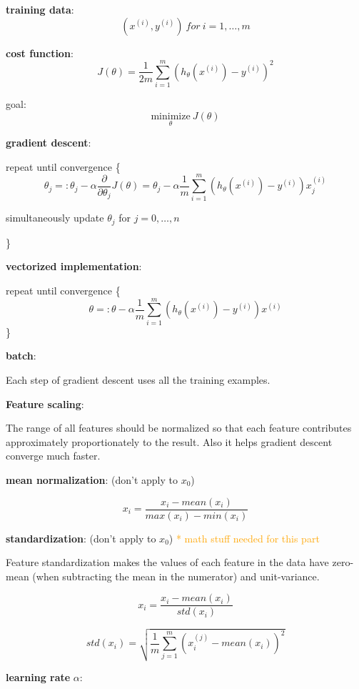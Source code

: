 \documentclass{article}
\begin{document}
\noindent \textbf{training data}:
\[(x^{(i)}, y^{(i)})\:for\:i = 1, \dots, m\]

\noindent \textbf{cost function}:
\[J(\theta) = \frac{1}{2m} \sum_{i = 1}^m (h_{\theta}(x^{(i)}) - y^{(i)})^2\]

\noindent goal:
\[\underset{\theta}{\text{minimize}} \: J(\theta)\]

\noindent \textbf{gradient descent}:

\noindent repeat until convergence \{
\[\theta_j =: \theta_j - \alpha \frac{\partial}{\partial \theta_j} J(\theta) = \theta_j - \alpha \frac{1}{m} \sum_{i = 1}^m (h_{\theta}(x^{(i)}) - y^{(i)}) x^{(i)}_j\]
\centerline{simultaneously update \(\theta_j\) for \(j = 0, \dots, n\)}
\}

\bigskip

\noindent \textbf{vectorized implementation}:

\noindent repeat until convergence \{
\[\theta =: \theta - \alpha \frac{1}{m} \sum_{i = 1}^m (h_{\theta}(x^{(i)}) - y^{(i)}) x^{(i)}\]
\}

\bigskip

\noindent \textbf{batch}:

\noindent Each step of gradient descent uses all the training examples.

\bigskip

\noindent \textbf{Feature scaling}:

\noindent The range of all features should be normalized so that each feature contributes approximately proportionately to the result. Also it helps gradient descent converge much faster.

\bigskip

\noindent \textbf{mean normalization}: (don't apply to \(x_0\))

\[x_i = \frac{x_i - mean(x_i)}{max(x_i) - min(x_i)}\]

\bigskip

\noindent \textbf{standardization}: (don't apply to \(x_0\)) \textcolor{orange}{ * math stuff needed for this part}

\noindent Feature standardization makes the values of each feature in the data have zero-mean (when subtracting the mean in the numerator) and unit-variance.

\[x_i = \frac{x_i - mean(x_i)}{std(x_i)}\]

\[std(x_i) = \sqrt{ \frac{1}{m} \sum_{j = 1}^m (x^{(j)}_i - mean(x_i))^2}\]

\noindent \textbf{learning rate} \(\alpha\):
\end{document}
